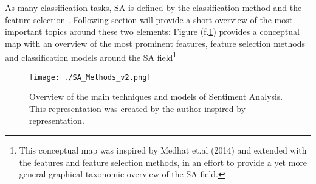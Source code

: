 \documentclass[
	a4paper,
	pdftex,
	12pt,	
	footinclude=true,
	fleqn,
	final,
	]{report}%
\begin{document}
As many classification tasks, SA is defined by the classification method and the feature selection \cite{Liu2010}. 
Following section will provide a short overview of the most important topics around these two elements: 
Figure (f.\ref{fig:6}) provides a conceptual map with an overview of the most prominent features, 
feature selection methods and classification models around the SA field\footnote{This conceptual map was inspired 
by Medhat et.al (2014) and extended with the features and feature selection methods, in an effort 
to provide a yet more general graphical taxonomic overview of the SA field.}

\begin{figure}[h]
 \centering
 \texttt{[image: ./SA\_Methods\_v2.png]}
 \caption[Main techniques and models related to Sentiment Analysis]{\small \centering Overview of the main techniques and models of Sentiment Analysis. This representation was created by the author inspired by \cite{Medhat2014} representation.}
 \label{fig:6}
\end{figure}
\end{document}
